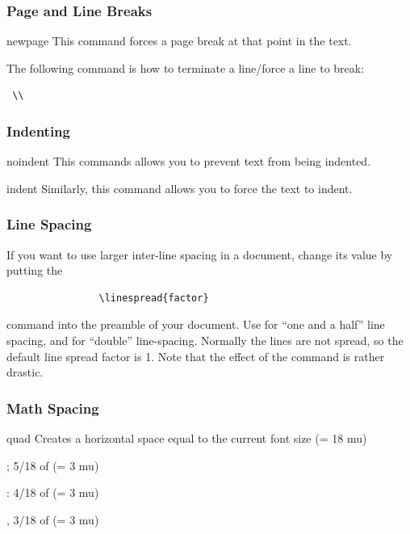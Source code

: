 		\subsubsection{Page and Line Breaks}\label{subsec:linebreaking}
			\begin{docCommand}{newpage}{}
				This command forces a page break at that point in the text. 
			\end{docCommand}
		The following command is how to terminate a line/force a line to break:
			\begin{verbatim} \\ \end{verbatim}
		\subsubsection{Indenting}
			\begin{docCommand}{noindent}{}
				This commands allows you to prevent text from being indented.
			\end{docCommand}
			\begin{docCommand}{indent}{}
				Similarly, this command allows you to force the text to indent.
			\end{docCommand}
		\subsubsection{Line Spacing}
			If you want to use larger inter-line spacing in a document, change its value by putting the
			\begin{verbatim}
				\linespread{factor}
			\end{verbatim}
			command into the preamble of your document. Use  for “one and a half” line spacing, and  for “double” line-spacing. Normally the lines are not spread, so the default line spread factor is 1.
			Note that the effect of the  command is rather drastic.
		\subsubsection{Math Spacing}
			\begin{docCommand}{quad}{}
				Creates a horizontal space equal to the current font size (= 18 mu)
			\end{docCommand}
			\begin{docCommand}{;}{}
				5/18 of  (= 3 mu)
			\end{docCommand}
			\begin{docCommand}{:}{}
				4/18 of \cs{quad} (= 3 mu)
			\end{docCommand}
			\begin{docCommand}{,}{}
				3/18 of  (= 3 mu)
			\end{docCommand}
